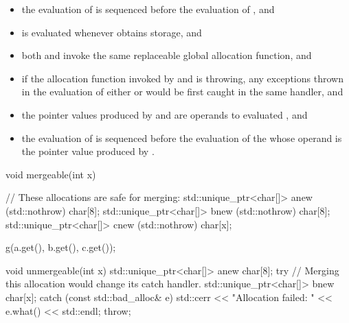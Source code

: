 \begin{itemize}
\item the evaluation of  is sequenced before the evaluation of
, and

\item {} is evaluated whenever  obtains storage, and

\item both  and  invoke the same replaceable global
allocation function, and

\item if the allocation function invoked by  and  is
throwing, any exceptions thrown in the evaluation of either  or
 would be first caught in the same handler, and

\item the pointer values produced by  and  are operands to
evaluated , and

\item the evaluation of  is sequenced before the evaluation of the
 whose operand is the pointer value produced
by .
\end{itemize}

\enterexample
\begin{codeblock}
  void mergeable(int x) {
    // These allocations are safe for merging:
    std::unique_ptr<char[]> a{new (std::nothrow) char[8]};
    std::unique_ptr<char[]> b{new (std::nothrow) char[8]};
    std::unique_ptr<char[]> c{new (std::nothrow) char[x]};

    g(a.get(), b.get(), c.get());
  }

  void unmergeable(int x) {
    std::unique_ptr<char[]> a{new char[8]};
    try {
      // Merging this allocation would change its catch handler.
      std::unique_ptr<char[]> b{new char[x]};
    } catch (const std::bad_alloc& e) {
      std::cerr << "Allocation failed: " << e.what() << std::endl;
      throw;
    }
  }
\end{codeblock}
\exitexample

